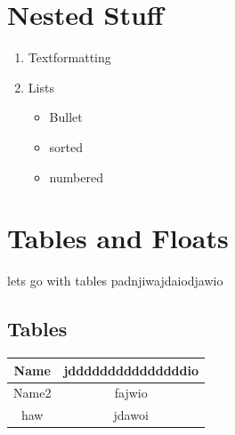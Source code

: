 \documentclass[11pt]{article}
\begin{document}
    \section{Nested Stuff}
    \begin{enumerate}
        \item Textformatting
        \item Lists \begin{itemize}
                        \item Bullet
                        \item sorted
                        \item numbered
        \end{itemize}
    \end{enumerate}


    \section{Tables and Floats}
    lets go with tables \bigskip
    padnjiwajdaiodjawio

    \subsection{Tables}
    \vspace{0.5cm}
    \begin{tabular}{|c||c|}
        \hline
        Name  & jdddddddddddddddio \\
        \hline
        Name2 & fajwio             \\
        \hline
        haw   & jdawoi             \\
        \hline
    \end{tabular}
\end{document}
